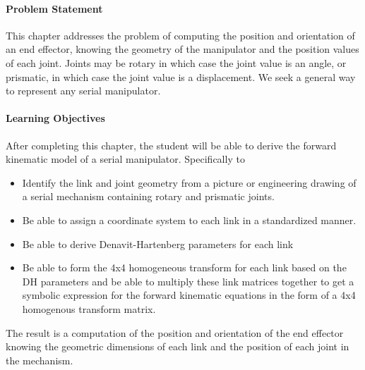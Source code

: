 \paragraph{Problem Statement}
 This chapter addresses the problem of computing the position and orientation of an end effector, knowing the geometry of the manipulator and the position values of each joint.  Joints may be rotary in which case the joint value is an angle, or prismatic, in which case the joint value is a displacement. We seek a general way to represent any serial manipulator. 

\paragraph{Learning Objectives}
 
After completing this chapter, the student will be able to derive the forward kinematic model of a serial manipulator.  Specifically to
\begin{itemize} 
  \item Identify the link and joint geometry from a picture or engineering drawing of a serial mechanism containing rotary and prismatic joints.
  \item Be able to assign a coordinate system to each link in a standardized manner. 
  \item Be able to derive Denavit-Hartenberg parameters for each link
  \item Be able to form the 4x4 homogeneous transform for each link based on the DH parameters and be able to multiply these link matrices together to get a symbolic expression for the forward kinematic equations in the form of a 4x4 homogenous transform matrix. 
\end{itemize}
The result is a computation of the position and orientation of the end effector knowing the geometric dimensions  of each link and the position of each joint in the mechanism.  


